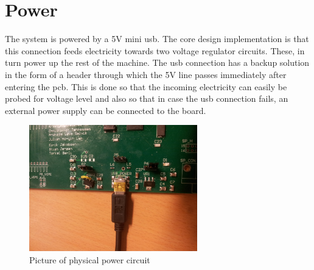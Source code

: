 \documentclass[../main/report.tex]{subfiles}
\begin{document}
\section{Power}

The system is powered by a 5V mini usb.
The core design implementation is that this connection feeds electricity towards two voltage regulator circuits.
These, in turn power up the rest of the machine.
The usb connection has a backup solution in the form of a header through which the 5V line passes immediately after entering the pcb.
This is done so that the incoming electricity can easily be probed for voltage level and also so that in case the usb connection fails, an external power supply can be connected to the board.

\begin{figure}[H]
	\centering
	\includegraphics[width=0.65\textwidth]{../pcb/assets/power.jpg}
	\caption{Picture of physical power circuit}
	\label{fig: power picture}
\end{figure}
\end{document}
